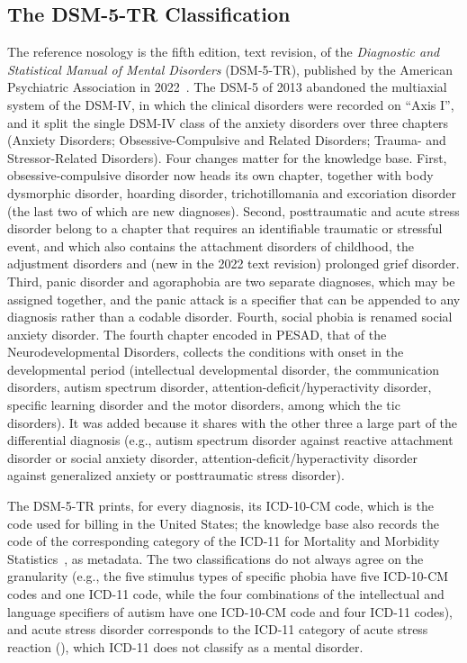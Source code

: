 \subsection{The DSM-5-TR Classification}

The reference nosology is the fifth edition, text revision, of the
\emph{Diagnostic and Statistical Manual of Mental Disorders} (DSM-5-TR),
published by the American Psychiatric Association in 2022~\cite{dsm}. The
DSM-5 of 2013 abandoned the multiaxial system of the DSM-IV, in which the
clinical disorders were recorded on ``Axis I'', and it split the single
DSM-IV class of the anxiety disorders over three chapters (Anxiety Disorders;
Obsessive-Compulsive and Related Disorders; Trauma- and Stressor-Related
Disorders). Four changes matter for the knowledge base. First, obsessive-compulsive
disorder now heads its own chapter, together with body dysmorphic disorder,
hoarding disorder, trichotillomania and excoriation disorder (the last two of
which are new diagnoses). Second, posttraumatic and acute stress disorder
belong to a chapter that requires an identifiable traumatic or stressful event,
and which also contains the attachment disorders of childhood, the adjustment
disorders and (new in the 2022 text revision) prolonged grief disorder. Third,
panic disorder and agoraphobia are two separate diagnoses, which may be assigned
together, and the panic attack is a specifier that can be appended to any
diagnosis rather than a codable disorder. Fourth, social phobia is renamed
social anxiety disorder. The fourth
chapter encoded in PESAD, that of the Neurodevelopmental Disorders, collects
the conditions with onset in the developmental period (intellectual
developmental disorder, the communication disorders, autism spectrum disorder,
attention-deficit/hyperactivity disorder, specific learning disorder and the
motor disorders, among which the tic disorders). It was added because it shares with the other three a large part of the
differential diagnosis (e.g.,
autism spectrum disorder against reactive attachment disorder or social
anxiety disorder, attention-deficit/hyperactivity disorder against generalized
anxiety or posttraumatic stress disorder).

The DSM-5-TR prints, for every diagnosis, its ICD-10-CM code, which is the code
used for billing in the United States; the knowledge base also records the
code of the corresponding category of the ICD-11 for Mortality and Morbidity
Statistics~\cite{icd11}, as metadata. The two classifications do not always
agree on the granularity (e.g., the five stimulus types of specific phobia
have five ICD-10-CM codes and one ICD-11 code, while the four combinations of
the intellectual and language specifiers of autism have one ICD-10-CM code and
four ICD-11 codes), and acute stress disorder corresponds to the ICD-11
category of acute stress reaction (), which ICD-11 does not
classify as a mental disorder.

